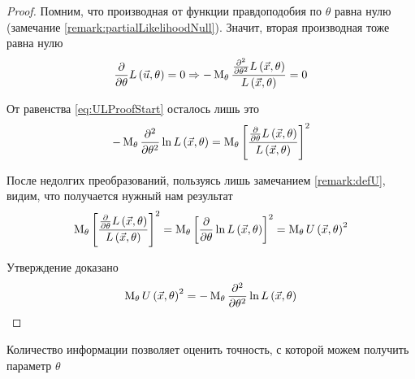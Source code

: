 \begin{proof}
    Помним, что производная от функции правдоподобия по $\theta$ равна нулю
    (замечание \ref{remark:partialLikelihoodNull}).
    Значит, вторая производная тоже равна нулю
    $$\frac{\partial}{\partial\theta}L\left( \vec{u},\theta \right) = 0
        \Rightarrow
            -\operatorname{M}_{\theta} 
            \frac{\frac{\partial^2}{\partial\theta^2}
                L\left(\vec{x},\theta\right)}
                {L\left(\vec{x},\theta\right)} = 0$$


    От равенства \eqref{eq:ULProofStart} осталось лишь это
    $$- \operatorname{M}_{\theta} \frac{\partial^2}{\partial\theta^2}
            \ln{L\left( \vec{x},\theta \right)}
        = \operatorname{M}_{\theta} \left[\frac{\frac{\partial}{\partial\theta}
                L\left(\vec{x},\theta\right)}
                {L\left(\vec{x},\theta\right)}\right]^2$$

    После недолгих преобразований, пользуясь лишь замечанием \ref{remark:defU},
    видим, что получается нужный нам результат
    \begin{align*}
        \operatorname{M}_{\theta} 
            \left[\frac{\frac{\partial}{\partial\theta}
                L\left(\vec{x},\theta\right)}
                {L\left(\vec{x},\theta\right)}\right]^2
        =\operatorname{M}_{\theta} \left[
            \frac{\partial}{\partial\theta}
            \ln{L\left( \vec{x},\theta \right)}\right]^2
        =\operatorname{M}_{\theta} U\left( \vec{x},\theta \right)^2
    \end{align*}

    Утверждение доказано
    $$\operatorname{M}_{\theta} U\left( \vec{x},\theta \right)^2
        =-\operatorname{M}_{\theta} 
            \frac{\partial^2}{\partial\theta^2}
            \ln{L\left( \vec{x},\theta \right)}$$
\end{proof}

Количество информации позволяет оценить точность,
с которой можем получить параметр $\theta$

